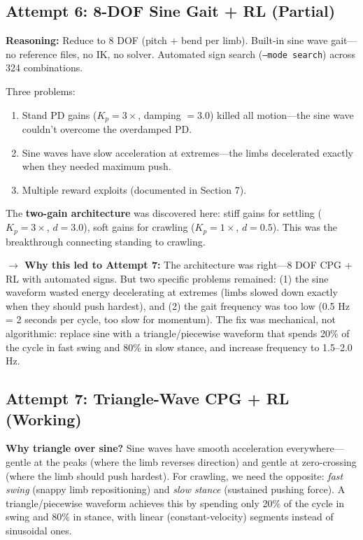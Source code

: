 \documentclass[11pt, a4paper]{article}
\begin{document}
\subsection{Attempt 6: 8-DOF Sine Gait + RL (Partial)}

\textbf{Reasoning:} Reduce to 8 DOF (pitch + bend per limb). Built-in sine wave gait---no reference files, no IK, no solver. Automated sign search (\texttt{--mode search}) across 324 combinations.

\begin{failbox}
Three problems:
\begin{enumerate}[nosep]
\item Stand PD gains ($K_p = 3\times$, damping $= 3.0$) killed all motion---the sine wave couldn't overcome the overdamped PD.
\item Sine waves have slow acceleration at extremes---the limbs decelerated exactly when they needed maximum push.
\item Multiple reward exploits (documented in Section 7).
\end{enumerate}
\end{failbox}

\begin{fixbox}
The \textbf{two-gain architecture} was discovered here: stiff gains for settling ($K_p = 3\times$, $d = 3.0$), soft gains for crawling ($K_p = 1\times$, $d = 0.5$). This was the breakthrough connecting standing to crawling.
\end{fixbox}

\noindent\textcolor{accentpurple}{\textbf{$\rightarrow$ Why this led to Attempt 7:}} The architecture was right---8 DOF CPG + RL with automated signs. But two specific problems remained: (1) the sine waveform wasted energy decelerating at extremes (limbs slowed down exactly when they should push hardest), and (2) the gait frequency was too low (0.5 Hz = 2 seconds per cycle, too slow for momentum). The fix was mechanical, not algorithmic: replace sine with a triangle/piecewise waveform that spends 20\% of the cycle in fast swing and 80\% in slow stance, and increase frequency to 1.5--2.0 Hz.

\subsection{Attempt 7: Triangle-Wave CPG + RL (\textcolor{successgreen}{Working})}

\begin{decisionbox}
\textbf{Why triangle over sine?} Sine waves have smooth acceleration everywhere---gentle at the peaks (where the limb reverses direction) and gentle at zero-crossing (where the limb should push hardest). For crawling, we need the opposite: \textit{fast swing} (snappy limb repositioning) and \textit{slow stance} (sustained pushing force). A triangle/piecewise waveform achieves this by spending only 20\% of the cycle in swing and 80\% in stance, with linear (constant-velocity) segments instead of sinusoidal ones.
\end{decisionbox}
\end{document}
